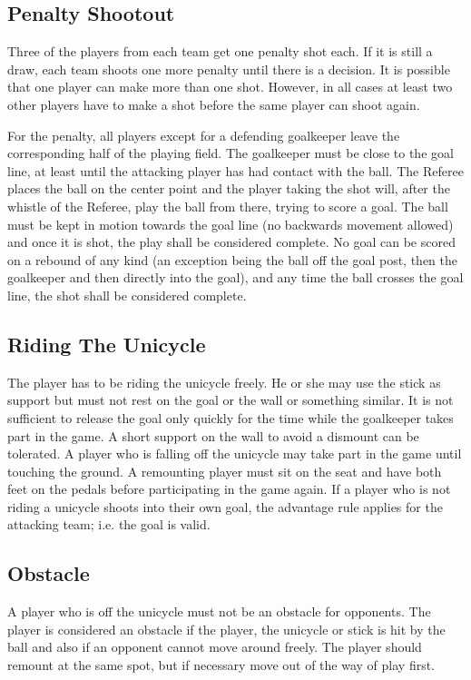 \subsection{Penalty Shootout}
Three of the players from each team get one penalty shot each.
If it is still a draw, each team shoots one more penalty until there is a decision.
It is possible that one player can make more than one shot.
However, in all cases at least two other players have to make a shot before the same player can shoot again.

For the penalty, all players except for a defending goalkeeper leave the corresponding half of the playing field.
The goalkeeper must be close to the goal line, at least until the attacking player has had contact with the ball.
The Referee places the ball on the center point and the player taking the shot will, after the whistle of the Referee, play the ball from there, trying to score a goal.
The ball must be kept in motion towards the goal line (no backwards movement allowed) and once it is shot, the play shall be considered complete.
No goal can be scored on a rebound of any kind (an exception being the ball off the goal post, then the goalkeeper and then directly into the goal), and any time the ball crosses the goal line, the shot shall be considered complete.

\subsection{Riding The Unicycle}
The player has to be riding the unicycle freely.
He or she may use the stick as support but must not rest on the goal or the wall or something similar.
It is not sufficient to release the goal only quickly for the time while the goalkeeper takes part in the game.
A short support on the wall to avoid a dismount can be tolerated.
A player who is falling off the unicycle may take part in the game until touching the ground.
A remounting player must sit on the seat and have both feet on the pedals before participating in the game again.
If a player who is not riding a unicycle shoots into their own goal, the advantage rule applies for the attacking team; i.e. the goal is valid.

\subsection{Obstacle}
A player who is off the unicycle must not be an obstacle for opponents.
The player is considered an obstacle if the player, the unicycle or stick is hit by the ball and also if an opponent cannot move around freely.
The player should remount at the same spot, but if necessary move out of the way of play first.

